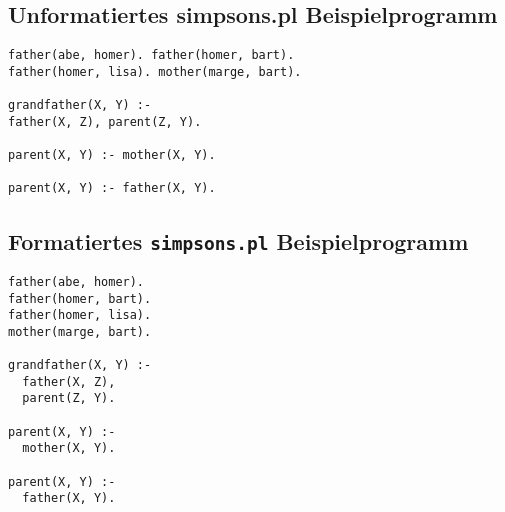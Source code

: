 \documentclass[parskip=full,11pt,twoside]{scrartcl}
\begin{document}
\subsection{Unformatiertes simpsons.pl Beispielprogramm}

\begin{lstlisting}
father(abe, homer). father(homer, bart).
father(homer, lisa). mother(marge, bart).

grandfather(X, Y) :-
father(X, Z), parent(Z, Y).

parent(X, Y) :- mother(X, Y).

parent(X, Y) :- father(X, Y).
\end{lstlisting}

\subsection{Formatiertes \texttt{simpsons.pl} Beispielprogramm}

\begin{lstlisting}
father(abe, homer).
father(homer, bart).
father(homer, lisa).
mother(marge, bart).

grandfather(X, Y) :-
  father(X, Z),
  parent(Z, Y).

parent(X, Y) :-
  mother(X, Y).

parent(X, Y) :-
  father(X, Y).
\end{lstlisting}
\end{document}
